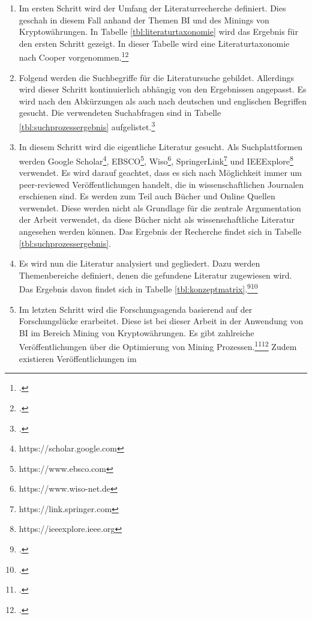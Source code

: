 \begin{enumerate} 
    \item Im ersten Schritt wird der Umfang der Literaturrecherche definiert. Dies geschah in diesem Fall anhand der Themen \ac{BI} und
    des Minings von Kryptowährungen. In Tabelle \ref{tbl:literaturtaxonomie} wird das Ergebnis für den ersten Schritt gezeigt. In
    dieser Tabelle wird eine Literaturtaxonomie nach Cooper vorgenommen.\footcite[Cf.][p. 2212]{brocke2009reconstructing}\footcite[Cf.][]{cooper1988organizing} 
    \item Folgend werden die Suchbegriffe für die Literatursuche gebildet. Allerdings wird dieser Schritt kontinuierlich abhängig von
    den Ergebnissen angepasst. Es wird nach den Abkürzungen als auch nach deutschen und englischen Begriffen gesucht. Die verwendeten 
    Suchabfragen sind in Tabelle \ref{tbl:suchprozessergebnis} aufgelistet.\footcite[Cf.][pp. 2211]{brocke2009reconstructing} 
    \item In diesem Schritt wird die eigentliche Literatur gesucht. Als Suchplattformen werden Google
    Scholar\footnote{https://scholar.google.com}, EBSCO\footnote{https://www.ebsco.com}, Wiso\footnote{https://www.wiso-net.de}, 
    SpringerLink\footnote{https://link.springer.com} und IEEExplore\footnote{https://ieeexplore.ieee.org} verwendet. Es wird darauf
    geachtet, dass es sich nach Möglichkeit immer um peer-reviewed Veröffentlichungen handelt, die in wissenschaftlichen Journalen
    erschienen sind. Es werden zum Teil auch Bücher und Online Quellen verwendet. Diese werden nicht als Grundlage für die zentrale
    Argumentation der Arbeit verwendet, da diese Bücher nicht als wissenschaftliche Literatur angesehen werden können. Das Ergebnis der
    Recherche findet sich in Tabelle \ref{tbl:suchprozessergebnis}. 
    \item Es wird nun die Literatur analysiert und gegliedert. Dazu werden Themenbereiche definiert, denen die gefundene Literatur
    zugewiesen wird. Das Ergebnis davon findet sich in Tabelle \ref{tbl:konzeptmatrix}.\footcite[Cf.][p. 2214]{brocke2009reconstructing}\footcite[Cf.][]{webster2002analyzing}  
    \item Im letzten Schritt wird die Forschungsagenda basierend auf der Forschungslücke erarbeitet. Diese ist bei dieser Arbeit in
    der Anwendung von \ac{BI} im Bereich Mining von Kryptowährungen. Es gibt zahlreiche Veröffentlichungen über die Optimierung von Mining
    Prozessen.\footcite[Cf.][]{han2019demystifying}\footcite[Cf.][]{courtois2014optimizing} Zudem existieren Veröffentlichungen im

\end{enumerate}
